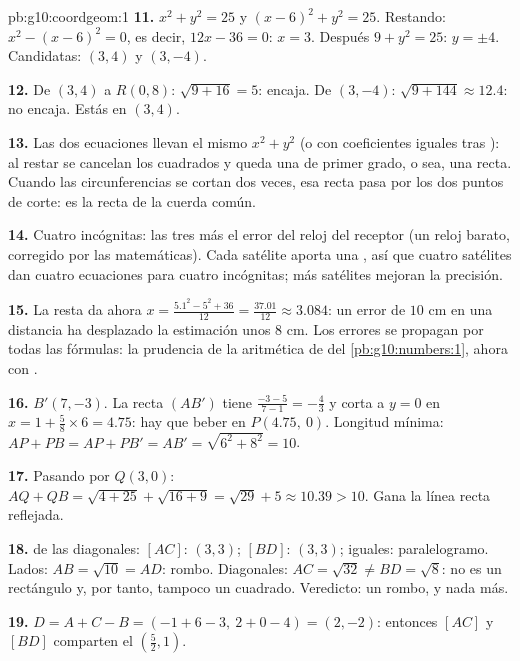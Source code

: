 \begin{solution}{pb:g10:coordgeom:1}
\textbf{11.} $x^2 + y^2 = 25$ y $(x - 6)^2 + y^2 = 25$. Restando:
$x^2 - (x - 6)^2 = 0$, es decir, $12x - 36 = 0$: $x = 3$. Después
$9 + y^2 = 25$: $y = \pm 4$. Candidatas: $(3, 4)$ y $(3, -4)$.

\textbf{12.} De $(3, 4)$ a $R(0, 8)$: $\sqrt{9 + 16} = 5$: encaja. De
$(3, -4)$: $\sqrt{9 + 144} \approx 12.4$: no encaja. Estás en $(3, 4)$.

\textbf{13.} Las dos ecuaciones llevan el mismo $x^2 + y^2$ (o con
coeficientes iguales tras ): al restar se cancelan los
cuadrados y queda una  de primer grado, o sea, una recta. Cuando
las circunferencias se cortan dos veces, esa recta pasa por los dos puntos
de corte: es la recta de la cuerda común.

\textbf{14.} Cuatro incógnitas: las tres  más el error del
reloj del receptor (un reloj barato, corregido por las matemáticas). Cada
satélite aporta una , así que cuatro satélites dan cuatro
ecuaciones para cuatro incógnitas; más satélites mejoran la precisión.

\textbf{15.} La resta da ahora
$x = \frac{5.1^2 - 5^2 + 36}{12} = \frac{37.01}{12} \approx 3.084$: un
error de $10$ cm en una distancia ha desplazado la estimación unos $8$ cm.
Los errores se propagan por todas las fórmulas: la prudencia de la
aritmética de  del \cref{pb:g10:numbers:1}, ahora con
.

\textbf{16.} $B'(7, -3)$. La recta $(AB')$ tiene 
$\frac{-3 - 5}{7 - 1} = -\frac43$ y corta a $y = 0$ en
$x = 1 + \frac{5}{8} \times 6 = 4.75$: hay que beber en $P(4.75,\ 0)$.
Longitud mínima: $AP + PB = AP + PB' = AB' = \sqrt{6^2 + 8^2} = 10$.

\textbf{17.} Pasando por $Q(3, 0)$:
$AQ + QB = \sqrt{4 + 25} + \sqrt{16 + 9} = \sqrt{29} + 5 \approx 10.39 >
10$. Gana la línea recta reflejada.

\textbf{18.}  de las diagonales: $[AC]$: $(3, 3)$; $[BD]$:
$(3, 3)$; iguales: paralelogramo. Lados: $AB = \sqrt{10} = AD$: rombo.
Diagonales: $AC = \sqrt{32} \neq BD = \sqrt{8}$: no es un rectángulo y,
por tanto, tampoco un cuadrado. Veredicto: un rombo, y nada más.

\textbf{19.} $D = A + C - B = (-1 + 6 - 3,\ 2 + 0 - 4) = (2, -2)$:
entonces $[AC]$ y $[BD]$ comparten el 
$\left(\frac52, 1\right)$.


\end{solution}
